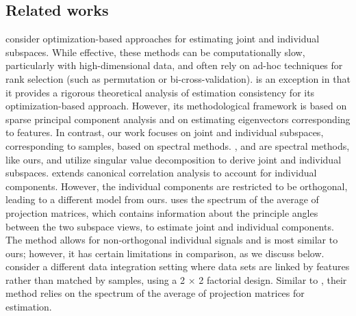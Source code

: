 \documentclass{amsart}
\begin{document}



\subsection{Related works}
 \citet{lock2013joint, zhou2015group, gaynanova2019structural, park2020integrative, yi2023hierarchical, prothero2024data, xiaoSparseIntegrativePrincipal2024} consider optimization-based approaches for estimating joint and individual subspaces. While effective, these methods can be computationally slow, particularly with high-dimensional data, and often rely on ad-hoc techniques for rank selection (such as permutation or bi-cross-validation). {\citet{xiaoSparseIntegrativePrincipal2024} is an exception in that it provides a rigorous theoretical analysis of estimation consistency for its optimization-based approach. However, its methodological framework is based on sparse principal component analysis and on estimating eigenvectors corresponding to features. In contrast, our work focuses on joint and individual subspaces, corresponding to samples, based on spectral methods. }\citet{feng2018angle}, \citet{shu2019d} { and \citet{chenTwostageLinkedComponent2022}} are spectral methods, like ours, and utilize singular value decomposition to derive joint and individual subspaces. \citet{shu2019d} extends canonical correlation analysis to account for individual components. However, the individual components are restricted to be orthogonal, leading to a different model from ours. \citet{feng2018angle} uses the spectrum of the average of projection matrices, which contains information about the principle angles between the two subspace views, to estimate joint and individual components. The method allows for non-orthogonal individual signals and is most similar to ours; however, it has certain limitations in comparison, as we discuss below. { \citet{chenTwostageLinkedComponent2022} consider a different data integration setting where data sets are linked by features rather than matched by samples, using a 2 $\times$ 2 factorial design. Similar to \citet{feng2018angle}, their method relies on the spectrum of the average of projection matrices for estimation.}
\end{document}
